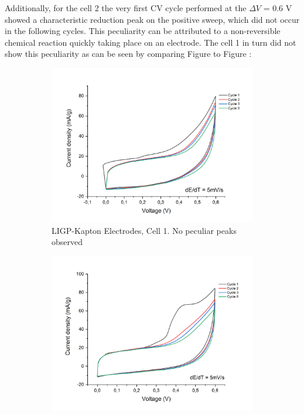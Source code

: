 Additionally, for the cell 2 the very first CV cycle performed at the $\Delta V$ = 0.6 V showed a characteristic reduction peak on the positive sweep, which did not occur in the following cycles. This peculiarity can be attributed to a non-reversible chemical reaction quickly taking place on an electrode. The cell 1 in turn did not show this peculiarity as can be seen by comparing Figure to Figure : 

\begin{figure}[H]
\begin{subfigure}{0.49\textwidth}
\includegraphics[width=1\textwidth]{Figures/Results/Electrochemistry/LIGP-PI-NaNO3-Swagelok/Cell1/CV-0.6-no-reaction-cell1.jpg} 
\captionsetup{width=0.9\linewidth}
\caption{LIGP-Kapton Electrodes, Cell 1. No peculiar peaks observed}
\label{fig:LIG-PI-cell1-CV-12-noreduction}
\end{subfigure}
\begin{subfigure}{0.49\textwidth}
\includegraphics[width=1\textwidth]{Figures/Results/Electrochemistry/LIGP-PI-NaNO3-Swagelok/Cell2/Reaction-higher-volt-Cell2.jpg}

\end{subfigure}
\end{figure}

